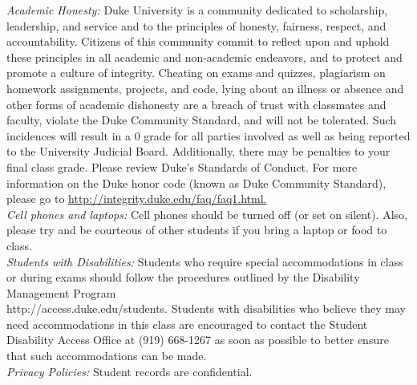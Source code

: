 \documentclass[11pt]{article}
\begin{document}
\emph{Academic Honesty:} Duke University is a community dedicated to scholarship, leadership, and service and to the principles of honesty, fairness, respect, and accountability. Citizens of this community commit to reflect upon and uphold these principles in all academic and non-academic endeavors, and to protect and promote a culture of integrity. Cheating on exams and quizzes, plagiarism on homework assignments, projects, and code, lying about an illness or absence and other forms of academic dishonesty are a breach of trust with classmates and faculty, violate the Duke Community Standard, and will not be tolerated. Such incidences will result in a 0 grade for all parties involved as well as being reported to the University Judicial Board. Additionally, there may be penalties to your final class grade. Please review Duke's Standards of Conduct.
For more information on the Duke honor code (known as Duke Community Standard), please go to \url{http://integrity.duke.edu/faq/faq1.html.}\\

\emph{Cell phones and laptops:} Cell phones should be turned off (or set on silent). Also, please try and be courteous of other students if you bring a laptop or food to class. \\


\emph{Students with Disabilities:} Students who require special accommodations in class or during exams should follow the procedures outlined by the Disability Management Program \\ http://access.duke.edu/students. Students with disabilities who believe they may need accommodations in this class are encouraged to contact the Student Disability Access Office at (919) 668-1267 as soon as possible to better ensure that such accommodations can be made. \\

\emph{Privacy Policies:} 
Student records are confidential.
\end{document}
